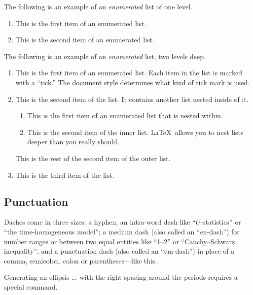 \documentclass[ps]{imsart}
\theoremstyle{plain}
\theoremstyle{definition}
\theoremstyle{remark}
\begin{document}
The following is an example of an \emph{enumerated} list of one level.

\begin{enumerate}
\item This is the first item of an enumerated list.
\item This is the second item of an enumerated list.
\end{enumerate}

The following is an example of an \emph{enumerated} list, two levels deep.
\begin{enumerate}
\item
This is the first item of an enumerated list.  Each item
in the list is marked with a ``tick.''  The document
style determines what kind of tick mark is used.
\item
This is the second item of the list.  It contains another
list nested inside of it.
\begin{enumerate}
\item
This is the first item of an enumerated list that
is nested within.
\item
This is the second item of the inner list.  \LaTeX\
allows you to nest lists deeper than you really should.
\end{enumerate}
This is the rest of the second item of the outer list.
\item
This is the third item of the list.
\end{enumerate}

\subsection{Punctuation}
Dashes come in three sizes: a hyphen, an intra-word dash like ``$U$-statistics'' or ``the time-homogeneous model'';
a medium dash (also called an ``en-dash'') for number ranges or between two equal entities like ``1--2'' or ``Cauchy--Schwarz inequality'';
and a punctuation dash (also called an ``em-dash'') in place of a comma, semicolon,
colon or parentheses---like this.

Generating an ellipsis \ldots\ with the right spacing
around the periods requires a special command.
\end{document}
